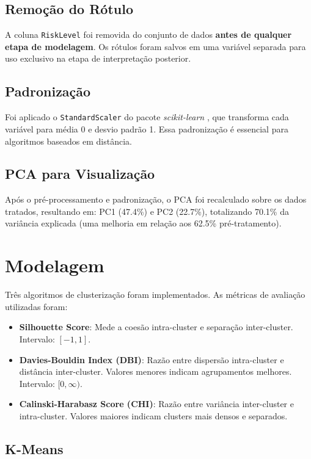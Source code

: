 \documentclass[12pt]{article}
\begin{document}
\subsection{Remoção do Rótulo}
A coluna \texttt{RiskLevel} foi removida do conjunto de dados \textbf{antes de qualquer etapa de modelagem}. Os rótulos foram salvos em uma variável separada para uso exclusivo na etapa de interpretação posterior.

\subsection{Padronização}
Foi aplicado o \texttt{StandardScaler} do pacote \textit{scikit-learn} \cite{scikit-learn}, que transforma cada variável para média 0 e desvio padrão 1. Essa padronização é essencial para algoritmos baseados em distância.

\subsection{PCA para Visualização}
Após o pré-processamento e padronização, o PCA foi recalculado sobre os dados tratados, resultando em: PC1 (47.4\%) e PC2 (22.7\%), totalizando 70.1\% da variância explicada (uma melhoria em relação aos 62.5\% pré-tratamento).

\section{Modelagem}

Três algoritmos de clusterização foram implementados. As métricas de avaliação \cite{scikit-learn} utilizadas foram:
\begin{itemize}
    \item \textbf{Silhouette Score}: Mede a coesão intra-cluster e separação inter-cluster. Intervalo: $[-1, 1]$.
    \item \textbf{Davies-Bouldin Index (DBI)}: Razão entre dispersão intra-cluster e distância inter-cluster. Valores menores indicam agrupamentos melhores. Intervalo: $[0, \infty)$.
    \item \textbf{Calinski-Harabasz Score (CHI)}: Razão entre variância inter-cluster e intra-cluster. Valores maiores indicam clusters mais densos e separados.
\end{itemize}

\subsection{K-Means}
\end{document}
